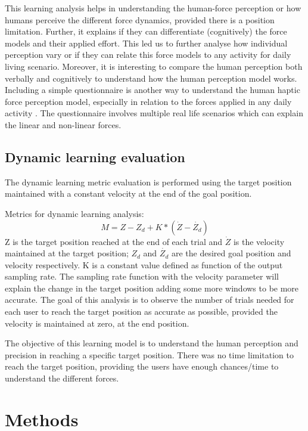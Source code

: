 This learning analysis helps in understanding the human-force perception or how humans perceive the different force dynamics, provided there is a position limitation. Further, it explains if they can differentiate (cognitively) the force models and their applied effort. This led us to further analyse how individual perception vary or if they can relate this force models to any activity for daily living scenario. Moreover, it is interesting to compare the human perception both verbally and cognitively to understand how the human perception model works. Including a simple questionnaire is another way to understand the human haptic force perception model, especially in relation to the forces applied in any daily activity \cite{van2014}. The questionnaire involves multiple real life scenarios which can explain the linear and non-linear forces.


\subsection*{Dynamic learning evaluation}
The dynamic learning metric evaluation is performed using the target position maintained with a constant velocity at the end of the goal position.

Metrics for dynamic learning analysis:
%
\begin{equation}
M=Z-Z_d +K* (\dot{Z}-\dot{Z_d})
\end{equation}
%
Z is the target position reached at the end of each trial and $\dot{Z} $ is the velocity maintained at the target position; $Z_d$  and $\dot{Z_d }$  are the desired goal position and velocity respectively. K is a constant value defined as function of the output sampling rate. The sampling rate function with the velocity parameter will explain the change in the target position adding some more windows to be more accurate.  The goal of this analysis is to observe the number of trials needed for each user to reach the target position as accurate as possible, provided the velocity is maintained at zero, at the end position.

The objective of this learning model is to understand the human perception and precision in reaching a specific target position. There was no time limitation to reach the target position, providing the users have enough chances/time to understand the different forces. 

\section{Methods}

